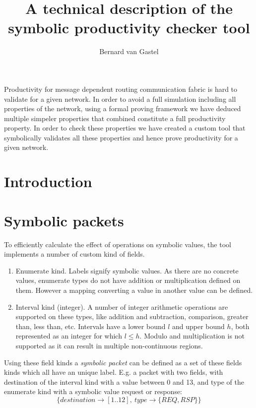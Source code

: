 \documentclass[a4paper]{article}
\title{A technical description of the \xmas symbolic productivity checker tool}
\author{Bernard van Gastel}
\begin{document}
\maketitle

{\abstract
Productivity for message dependent routing communication fabric is hard to validate for a given network. In order to avoid a full simulation including all properties of the network, using a formal proving framework we have deduced multiple simpeler properties that combined constitute a full productivity property. In order to check these properties we have created a custom \cpp tool that symbolically validates all these properties and hence prove productivity for a given network.
}

\section{Introduction}


\section{Symbolic packets}
To efficiently calculate the effect of operations on symbolic values, the tool implements a number of custom kind of fields.
\begin{enumerate}
\item Enumerate kind. Labels signify symbolic values. As there are no concrete values, enumerate types do not have addition or multiplication defined on them. However a mapping converting a value in another value can be defined. %
\item Interval kind (integer). A number of integer arithmetic operations are supported on these types, like addition and subtraction, comparison, greater than, less than, etc. Intervals have a lower bound $l$ and upper bound $h$, both represented as an integer for which $l \leq h$. Modulo and multiplication is not supported as it can result in multiple non-continuous regions.
\end{enumerate}

Using these field kinds a \emph{symbolic packet} can be defined as a set of these fields kinds which all have an unique label. E.g. a packet with two fields, with destination of the interval kind with a value between 0 and 13, and type of the enumerate kind with a symbolic value request or response: \[
	\{destination \to [1..12],\ type \to \{REQ,RSP\}\}
\]
\end{document}
